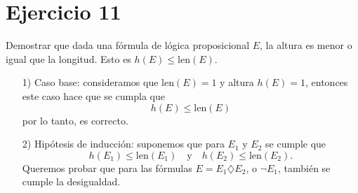 \chapter*{Ejercicio 11}

Demostrar que dada una fórmula de lógica proposicional $E$, la altura es menor o igual que la longitud. Esto es $h(E) \leq \text{len}(E)$. \\

\begin{enumerate}
    \item[1)] Caso base: consideramos que $\text{len}(E) = 1$ y altura $h(E) = 1$, entonces este caso hace que se cumpla que
    \[
    h(E) \leq \text{len}(E)
    \]
    por lo tanto, es correcto.

    \item[2)] Hipótesis de inducción: suponemos que para $E_1$ y $E_2$ se cumple que
    \[
    h(E_1) \leq \text{len}(E_1) \quad \text{y} \quad h(E_2) \leq \text{len}(E_2).
    \]
    Queremos probar que para las fórmulas $E = E_1  \diamondsuit E_2$, o $\neg E_1$, también se cumple la desigualdad.


\end{enumerate}
